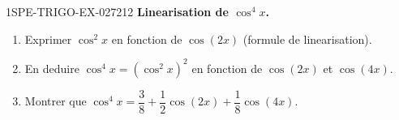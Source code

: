 \begin{exercice}{1SPE-TRIGO-EX-027}{2}{12}
\textbf{Linearisation de $\cos^4 x$.}
\begin{enumerate}
  \item Exprimer $\cos^2 x$ en fonction de $\cos(2x)$ (formule de linearisation).
  \item En deduire $\cos^4 x = \left(\cos^2 x\right)^2$ en fonction de $\cos(2x)$ et $\cos(4x)$.
  \item Montrer que $\cos^4 x = \dfrac{3}{8} + \dfrac{1}{2}\cos(2x) + \dfrac{1}{8}\cos(4x)$.
\end{enumerate}
\end{exercice}

